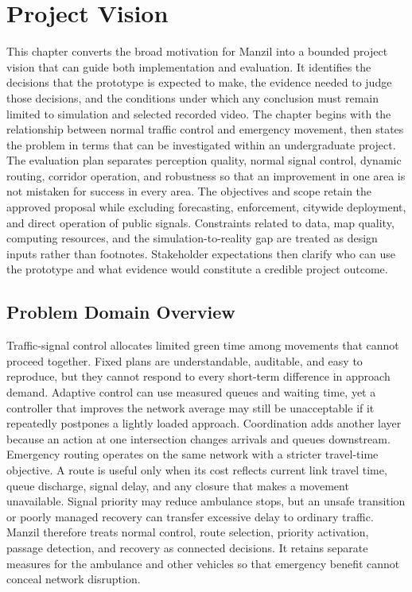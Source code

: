 \chapter{Project Vision}
\label{ch:vision}

This chapter converts the broad motivation for Manzil into a bounded project vision that can guide both implementation and evaluation. It identifies the decisions that the prototype is expected to make, the evidence needed to judge those decisions, and the conditions under which any conclusion must remain limited to simulation and selected recorded video. The chapter begins with the relationship between normal traffic control and emergency movement, then states the problem in terms that can be investigated within an undergraduate project. The evaluation plan separates perception quality, normal signal control, dynamic routing, corridor operation, and robustness so that an improvement in one area is not mistaken for success in every area. The objectives and scope retain the approved proposal while excluding forecasting, enforcement, citywide deployment, and direct operation of public signals. Constraints related to data, map quality, computing resources, and the simulation-to-reality gap are treated as design inputs rather than footnotes. Stakeholder expectations then clarify who can use the prototype and what evidence would constitute a credible project outcome.

\section{Problem Domain Overview}

Traffic-signal control allocates limited green time among movements that cannot proceed together. Fixed plans are understandable, auditable, and easy to reproduce, but they cannot respond to every short-term difference in approach demand. Adaptive control can use measured queues and waiting time, yet a controller that improves the network average may still be unacceptable if it repeatedly postpones a lightly loaded approach. Coordination adds another layer because an action at one intersection changes arrivals and queues downstream. Emergency routing operates on the same network with a stricter travel-time objective. A route is useful only when its cost reflects current link travel time, queue discharge, signal delay, and any closure that makes a movement unavailable. Signal priority may reduce ambulance stops, but an unsafe transition or poorly managed recovery can transfer excessive delay to ordinary traffic. Manzil therefore treats normal control, route selection, priority activation, passage detection, and recovery as connected decisions. It retains separate measures for the ambulance and other vehicles so that emergency benefit cannot conceal network disruption.

